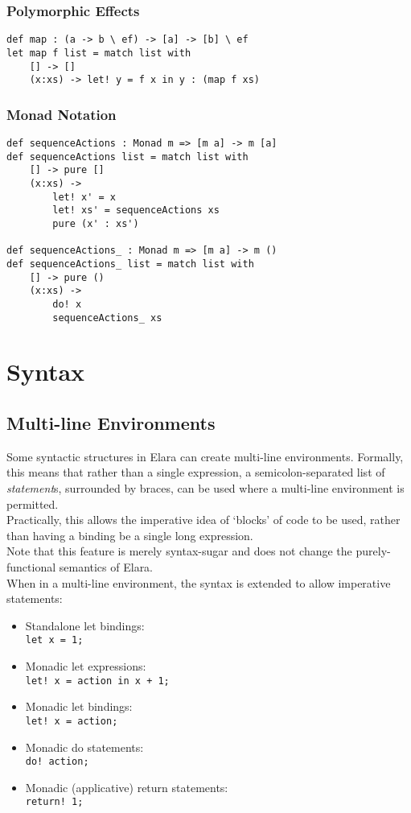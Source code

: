 \documentclass{report}
\begin{document}
\subsubsection{Polymorphic Effects}
\begin{verbatim}
def map : (a -> b \ ef) -> [a] -> [b] \ ef
let map f list = match list with
    [] -> []
    (x:xs) -> let! y = f x in y : (map f xs)
\end{verbatim}

\subsubsection{Monad Notation}
\begin{verbatim}
def sequenceActions : Monad m => [m a] -> m [a]
def sequenceActions list = match list with
    [] -> pure []
    (x:xs) ->
        let! x' = x
        let! xs' = sequenceActions xs
        pure (x' : xs')

def sequenceActions_ : Monad m => [m a] -> m ()
def sequenceActions_ list = match list with
    [] -> pure ()
    (x:xs) ->
        do! x
        sequenceActions_ xs
\end{verbatim}


\section{Syntax}
\subsection{Multi-line Environments}\label{sec:multi-line-environments}
Some syntactic structures in Elara can create multi-line environments. Formally, this means that rather than a single expression, a semicolon-separated list of \emph{statement}s, surrounded by braces, can be used where a multi-line environment is permitted. \\
Practically, this allows the imperative idea of `blocks' of code to be used, rather than having a binding be a single long expression.\\
Note that this feature is merely syntax-sugar and does not change the purely-functional semantics of Elara.\\
When in a multi-line environment, the syntax is extended to allow imperative statements:
\begin{itemize}
    \item{Standalone let bindings: \\\verb|let x = 1;|}
    \item{Monadic let expressions: \\\verb|let! x = action in x + 1;|}
    \item{Monadic let bindings: \\\verb|let! x = action;|}
    \item{Monadic do statements: \\\verb|do! action;|}
    \item{Monadic (applicative) return statements: \\\verb|return! 1;|}
\end{itemize}
\end{document}
